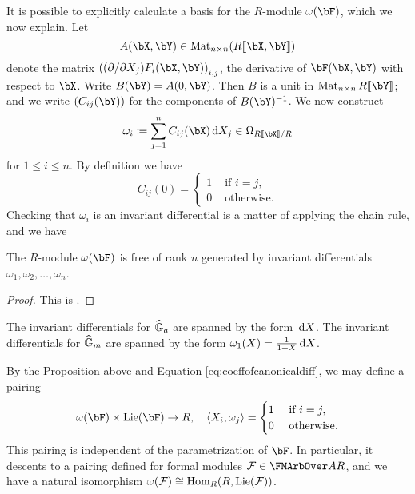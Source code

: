 \documentclass[../main.tex]{subfiles}
\begin{document}
It is possible to explicitly calculate a basis for the $R$-module
$\omega(\bF)$, which we now explain. Let 
$$A(\bX, \bY) \in \Mat_{n \times n} (R\llbr \bX, \bY \rrbr)$$ 
denote the matrix $\left((\partial/\partial X_j)F_i (\bX,\bY)\right)_{i,j}$,
the derivative of $\bF(\bX,\bY)$ with respect to $\bX$. Write 
$B(\bY) = A(0,\bY)$. Then $B$ is a unit in $\Mat_{n \times n} R\llbr \bY \rrbr$; 
and we write $(C_{ij}(\bY))$ for the components of 
$B(\bY)^{-1}$. We now construct 
$$\omega_{i} \coloneqq \sum_{j=1}^n C_{ij}(\bX) \dc X_j \in \Omega_{R\llbr \bX \rrbr/R}$$ 
for $1 \leq i \leq n$. By definition we have 
\begin{equation}\label{eq:coeffofcanonicaldiff}
  C_{ij}(0) = \begin{cases}
    1 &\text{ if }i = j,\\
    0 &\text{ otherwise.}
  \end{cases}
\end{equation}
Checking that $\omega_{i}$ is an invariant differential is a matter of
applying the chain rule, and we have
\begin{prop}
    The $R$-module $\omega(\bF)$ is free of rank $n$ generated by invariant differentials
    $\omega_{1}, \omega_{2}, \dots, \omega_{n}$.
\begin{proof}
  This is \cite[Proposition 1.1]{1970HondaFormalGroups}. 
\end{proof}
\end{prop}
\begin{xpl}
  The invariant differentials for $\widehat{\mathbb{G}}_a$ are spanned by the form $\, \mathrm{d} X$. 
  The invariant differentials for $\widehat{\mathbb{G}}_m$ are spanned by the form 
  $\omega_1(X) = \frac 1{1+X} \, \mathrm{d} X$.
\end{xpl}
By the Proposition above and Equation \eqref{eq:coeffofcanonicaldiff}, we may
define a pairing
\begin{equation*}
  \omega(\bF) \times \Lie(\bF) \to R, \quad \langle X_i, \omega_j \rangle =
  \begin{cases}
    1 &\text{ if } i = j,\\
    0 &\text{ otherwise.}
  \end{cases}
\end{equation*}
This pairing is independent of the parametrization of $\bF$. In particular, it
descents to a pairing defined for formal modules $\cF \in \FMArbOver A R$, and
we have a natural isomorphism $\omega(\mathcal{F}) \cong \operatorname{Hom}_R(R, \operatorname{Lie}(\mathcal{F}))$.
\end{document}
